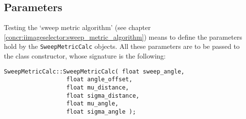 \subsection{Parameters}
\label{performance_evaluation:parameters}

Testing the `sweep metric algorithm' (see chapter
\ref{concr:iimageselector:sweep_metric_algorithm}) means to define
the parameters hold by the \texttt{SweepMetricCalc}
objects. All these parameters are 
to be passed to the class constructor, whose signature
is the following:

\begin{lstlisting}[caption={\texttt{SweepMetricCalc} class declaration}, label={code:sweepmetriccalc}, frame=trBL]
SweepMetricCalc::SweepMetricCalc( float sweep_angle,
				  float angle_offset,
				  float mu_distance,
				  float sigma_distance,
				  float mu_angle,
				  float sigma_angle );				  
\end{lstlisting}



